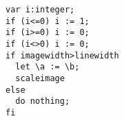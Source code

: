\documentclass{article}
\begin{document}
\begin{lstlisting}
var i:integer;
if (i<=0) i := 1;
if (i>=0) i := 0;
if (i<>0) i := 0;
if imagewidth>linewidth 
  let \a := \b;
  scaleimage
else
  do nothing;
fi
\end{lstlisting}
\end{document}
